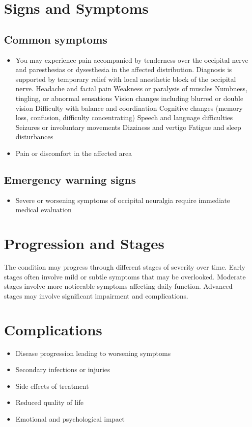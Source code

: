 \section{Signs and Symptoms}

\subsection{Common symptoms}
\begin{itemize}[noitemsep]
  \item You may experience pain accompanied by tenderness over the occipital nerve and paresthesias or dysesthesia in the affected distribution. Diagnosis is supported by temporary relief with local anesthetic block of the occipital nerve. Headache and facial pain Weakness or paralysis of muscles Numbness, tingling, or abnormal sensations Vision changes including blurred or double vision Difficulty with balance and coordination Cognitive changes (memory loss, confusion, difficulty concentrating) Speech and language difficulties Seizures or involuntary movements Dizziness and vertigo Fatigue and sleep disturbances
  \item Pain or discomfort in the affected area
  \end{itemize}

\subsection{Emergency warning signs}
\begin{itemize}[noitemsep]
  \item Severe or worsening symptoms of occipital neuralgia require immediate medical evaluation
\end{itemize}
\section{Progression and Stages}
The condition may progress through different stages of severity over time. Early stages often involve mild or subtle symptoms that may be overlooked. Moderate stages involve more noticeable symptoms affecting daily function. Advanced stages may involve significant impairment and complications.
\section{Complications}
\begin{itemize}[noitemsep]
  \item Disease progression leading to worsening symptoms
  \item Secondary infections or injuries
  \item Side effects of treatment
  \item Reduced quality of life
  \item Emotional and psychological impact
\end{itemize}
